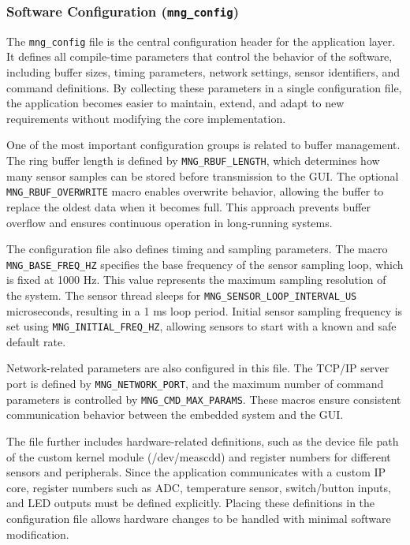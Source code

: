 \documentclass{article}
\begin{document}
\subsubsection{Software Configuration (\texttt{mng\_config})}

The \texttt{mng\_config} file is the central configuration header for the application layer.
 It defines all compile-time parameters that control the behavior of the software, 
 including buffer sizes, timing parameters, network settings, sensor identifiers, 
 and command definitions. By collecting these parameters in a single configuration 
 file, the application becomes easier to maintain, extend, and adapt to new 
 requirements without modifying the core implementation.

One of the most important configuration groups is related to buffer management. 
The ring buffer length is defined by \texttt{MNG\_RBUF\_LENGTH}, which determines how many 
sensor samples can be stored before transmission to the GUI. The optional 
\texttt{MNG\_RBUF\_OVERWRITE} macro enables overwrite behavior, allowing the buffer to replace 
the oldest data when it becomes full. This approach prevents buffer overflow and 
ensures continuous operation in long-running systems.

The configuration file also defines timing and sampling parameters. The macro 
\texttt{MNG\_BASE\_FREQ\_HZ} specifies the base frequency of the sensor sampling loop, which 
is fixed at 1000 Hz. This value represents the maximum sampling resolution of the 
system. The sensor thread sleeps for \texttt{MNG\_SENSOR\_LOOP\_INTERVAL\_US} 
microseconds, resulting in a 1 ms loop period. Initial sensor sampling frequency 
is set using \texttt{MNG\_INITIAL\_FREQ\_HZ}, allowing sensors to start with a known and safe 
default rate.

Network-related parameters are also configured in this file. The TCP/IP server 
port is defined by \texttt{MNG\_NETWORK\_PORT}, and the maximum number of command parameters 
is controlled by \texttt{MNG\_CMD\_MAX\_PARAMS}. These macros ensure consistent communication 
behavior between the embedded system and the GUI.

The file further includes hardware-related definitions, such as the device file 
path of the custom kernel module (/dev/meascdd) and register numbers for different 
sensors and peripherals. Since the application communicates with a custom IP core, 
register numbers such as ADC, temperature sensor, switch/button inputs, and LED 
outputs must be defined explicitly. Placing these definitions in the configuration 
file allows hardware changes to be handled with minimal software modification.
\end{document}
